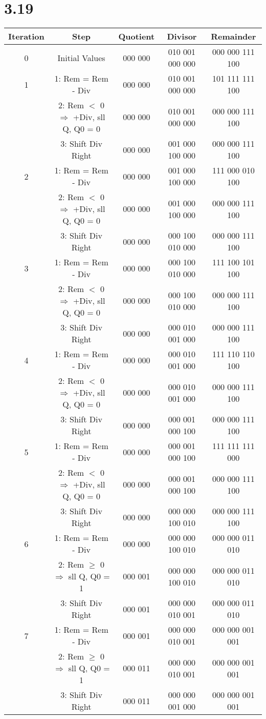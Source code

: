 \documentclass[12pt]{article}
\begin{document}
\section*{3.19}
\begin{tabular}{|c|c|c|c|c|}
	\hline
	Iteration & Step & Quotient & Divisor & Remainder\\
	\hline
	0 & Initial Values & 000 000 & 010 001 000 000 & 000 000 111 100\\
	\hline
	1 & 1: Rem = Rem - Div & 000 000 & 010 001 000 000 & 101 111 111 100\\
	  & 2: Rem $<$ 0 $\Rightarrow$ +Div, sll Q, Q0 = 0 & 000 000 & 010 001 000 000 & 000 000 111 100\\
	  & 3: Shift Div Right & 000 000 & 001 000 100 000 & 000 000 111 100\\
	\hline
	2 & 1: Rem = Rem - Div & 000 000 & 001 000 100 000 & 111 000 010 100\\
	  & 2: Rem $<$ 0 $\Rightarrow$ +Div, sll Q, Q0 = 0 & 000 000 & 001 000 100 000 & 000 000 111 100\\
	  & 3: Shift Div Right & 000 000 & 000 100 010 000 & 000 000 111 100\\
	 \hline
	3 & 1: Rem = Rem - Div & 000 000 & 000 100 010 000 & 111 100 101 100\\
	  & 2: Rem $<$ 0 $\Rightarrow$ +Div, sll Q, Q0 = 0 & 000 000 & 000 100 010 000 & 000 000 111 100\\
	  & 3: Shift Div Right & 000 000 & 000 010 001 000 & 000 000 111 100\\
	\hline
	4 & 1: Rem = Rem - Div & 000 000 & 000 010 001 000 & 111 110 110 100\\
	  & 2: Rem $<$ 0 $\Rightarrow$ +Div, sll Q, Q0 = 0 & 000 000 & 000 010 001 000 & 000 000 111 100\\
	  & 3: Shift Div Right & 000 000 & 000 001 000 100 & 000 000 111 100\\
	\hline
	5 & 1: Rem = Rem - Div & 000 000 & 000 001 000 100 & 111 111 111 000\\
	  & 2: Rem $<$ 0 $\Rightarrow$ +Div, sll Q, Q0 = 0 & 000 000 & 000 001 000 100 & 000 000 111 100\\
	  & 3: Shift Div Right & 000 000 & 000 000 100 010 & 000 000 111 100\\
	\hline
	6 & 1: Rem = Rem - Div & 000 000 & 000 000 100 010 & 000 000 011 010\\
	  & 2: Rem $\geq$ 0 $\Rightarrow$ sll Q, Q0 = 1 & 000 001 & 000 000 100 010 & 000 000 011 010\\
	  & 3: Shift Div Right & 000 001 & 000 000 010 001 & 000 000 011 010\\
	\hline
	7 & 1: Rem = Rem - Div & 000 001 & 000 000 010 001 & 000 000 001 001\\
	  & 2: Rem $\geq$ 0 $\Rightarrow$ sll Q, Q0 = 1 & 000 011 & 000 000 010 001 & 000 000 001 001\\
	  & 3: Shift Div Right & 000 011 & 000 000 001 000 & 000 000 001 001\\
	\hline
\end{tabular}\\
\end{document}
